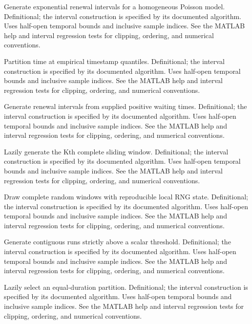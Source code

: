 {Generate exponential renewal intervals for a homogeneous Poisson model.}
{Definitional; the interval construction is specified by its documented algorithm.}
{Uses half-open temporal bounds and inclusive sample indices. See the MATLAB help and interval regression tests for clipping, ordering, and numerical conventions.}

{Partition time at empirical timestamp quantiles.}
{Definitional; the interval construction is specified by its documented algorithm.}
{Uses half-open temporal bounds and inclusive sample indices. See the MATLAB help and interval regression tests for clipping, ordering, and numerical conventions.}

{Generate renewal intervals from supplied positive waiting times.}
{Definitional; the interval construction is specified by its documented algorithm.}
{Uses half-open temporal bounds and inclusive sample indices. See the MATLAB help and interval regression tests for clipping, ordering, and numerical conventions.}

{Lazily generate the Kth complete sliding window.}
{Definitional; the interval construction is specified by its documented algorithm.}
{Uses half-open temporal bounds and inclusive sample indices. See the MATLAB help and interval regression tests for clipping, ordering, and numerical conventions.}

{Draw complete random windows with reproducible local RNG state.}
{Definitional; the interval construction is specified by its documented algorithm.}
{Uses half-open temporal bounds and inclusive sample indices. See the MATLAB help and interval regression tests for clipping, ordering, and numerical conventions.}

{Generate contiguous runs strictly above a scalar threshold.}
{Definitional; the interval construction is specified by its documented algorithm.}
{Uses half-open temporal bounds and inclusive sample indices. See the MATLAB help and interval regression tests for clipping, ordering, and numerical conventions.}

{Lazily select an equal-duration partition.}
{Definitional; the interval construction is specified by its documented algorithm.}
{Uses half-open temporal bounds and inclusive sample indices. See the MATLAB help and interval regression tests for clipping, ordering, and numerical conventions.}

